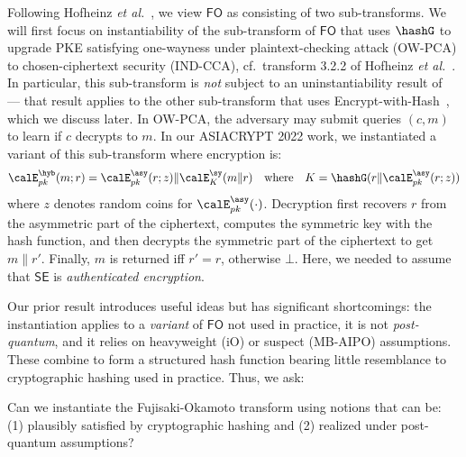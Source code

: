 Following Hofheinz \emph{et al.}~\cite{TCC:HofHovKil17}, we  view $\mathsf{FO}$ as consisting of two sub-transforms.
We will first focus on instantiability of the sub-transform of $\mathsf{FO}$ that uses $\hashG$  to upgrade PKE satisfying one-wayness under plaintext-checking attack (OW-PCA) to chosen-ciphertext security (IND-CCA), cf.~transform 3.2.2 of Hofheinz \emph{et al.}~\cite{TCC:HofHovKil17}. In particular, this sub-transform is \emph{not} subject to an uninstantiability result of~\cite{TCC:BrzFarMit15} --- that result applies to the other sub-transform that uses Encrypt-with-Hash~\cite{C:BelBolOne07}, which we discuss later.  In OW-PCA, the adversary may submit queries $(c,m)$ to learn if $c$ decrypts to $m$. In our ASIACRYPT 2022  work, we instantiated a variant of this sub-transform where encryption is:
\[
\calE^{\hyb}_{pk}(m;r) = 
\calE^{\asy}_{pk}(r;z) \| \calE^{\sy}_{K}(m \| r) 
\quad \mbox{where} \quad
K = \hashG(r\| \calE^{\asy}_{pk}(r;z))
\]
where $z$ denotes random coins for $\calE^{\asy}_{pk}(\cdot)$.
Decryption first recovers $r$ from the asymmetric  part of the  ciphertext, computes the symmetric key with the hash function, and then decrypts the symmetric part of the ciphertext to get $m\|r'$. Finally, $m$ is returned iff $r'=r$, otherwise $\bot$. Here, we needed to assume that   $\mathsf{SE}$ is \emph{authenticated encryption}. 
    
 Our prior result introduces useful ideas but has significant shortcomings: the instantiation applies  to a \emph{variant} of $\mathsf{FO}$ not used in practice,  it is not \emph{post-quantum},  and it relies on heavyweight (iO) or suspect (MB-AIPO) assumptions.  These combine to form a  structured hash function bearing little resemblance to cryptographic hashing used in practice. Thus, we ask:

\begin{ques}
    Can we instantiate the Fujisaki-Okamoto transform using notions that can  be: (1) plausibly satisfied by cryptographic hashing and (2) realized under post-quantum assumptions?
\end{ques}

